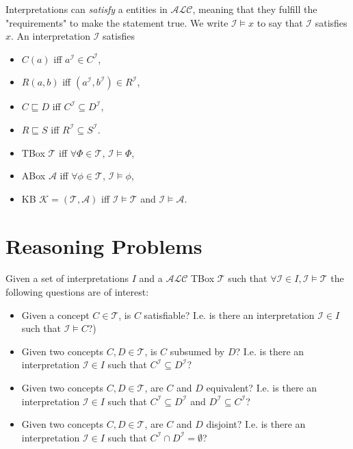 Interpretations can \emph{satisfy} a entities in $\mathcal{ALC}$, meaning that they fulfill the "requirements" to make the statement true. We write $\mathcal{I} \models x$ to say that $\mathcal{I}$ satisfies $x$. An interpretation $\mathcal{I}$ satisfies
\begin{itemize}
    \item $C(a)$ iff $a^{\mathcal{I}} \in C^{\mathcal{I}}$,
    \item $R(a,b)$ iff $(a^{\mathcal{I}},b^{\mathcal{I}})  \in R^{\mathcal{I}}$,
    \item $C \sqsubseteq D$ iff $C^{\mathcal{I}} \subseteq D^{\mathcal{I}}$,
    \item $R \sqsubseteq S$ iff $R^{\mathcal{I}}  \subseteq S^{\mathcal{I}}$.
    \item TBox $\mathcal{T}$ iff $\forall \Phi \in \mathcal{T}$, $\mathcal{I} \models \Phi$,
    \item ABox $\mathcal{A}$ iff $\forall \phi \in \mathcal{T}$, $\mathcal{I} \models \phi$,
    \item KB $\mathcal{K} = (\mathcal{T}, \mathcal{A})$ iff $\mathcal{I} \models \mathcal{T}$ and $\mathcal{I} \models \mathcal{A}$.

\end{itemize} 


\section{Reasoning Problems}
Given a set of interpretations $I$ and a $\mathcal{ALC}$ TBox $\mathcal{T}$ such that $\forall \mathcal{I} \in I, \mathcal{I}\models \mathcal{T}$ the following questions are of interest:
\begin{itemize}
    \item Given a concept $C \in \mathcal{T}$, is $C$ satisfiable? I.e. is there an interpretation $\mathcal{I} \in I$ such that $\mathcal{I} \models C$?)
    \item Given two concepts $C, D \in \mathcal{T}$, is $C$ subsumed by $D$? I.e. is there an interpretation $\mathcal{I} \in I$ such that $C^\mathcal{I} \subseteq D^\mathcal{I}$?
    \item Given two concepts $C, D \in \mathcal{T}$, are $C$ and $D$ equivalent? I.e. is there an interpretation $\mathcal{I} \in I$ such that $C^\mathcal{I} \subseteq D^\mathcal{I}$ and $D^\mathcal{I} \subseteq C^\mathcal{I}$?
    \item Given two concepts $C, D \in \mathcal{T}$, are $C$ and $D$ disjoint? I.e. is there an interpretation $\mathcal{I} \in I$ such that $C^\mathcal{I} \cap D^\mathcal{I} = \emptyset$?
\end{itemize}

